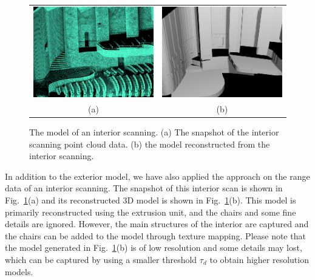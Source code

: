 \documentclass{acmsiggraph}                     %
\newcommand{\Figa}[1]{Fig.~\ref{fig:#1}(a)}
\newcommand{\Figb}[1]{Fig.~\ref{fig:#1}(b)}
\begin{document}
\begin{figure}[htbp]
\begin{center}
\begin{tabular}{cc}
\includegraphics[width=2.5in]{range_crop.png} &
\includegraphics[width=2.5in]{HunterTheatreShaded.jpg} \\
(a) & (b)
\end{tabular}
\end{center}
\caption{The model of an interior scanning. (a) The snapshot of the interior
scanning point cloud data. (b) the model reconstructed from the interior
scanning.}
\label{fig:IN}
\end{figure}

In addition to the exterior model, we have also applied the approach on
the range data of an interior scanning.
The snapshot of this interior scan is shown in \Figa{IN}
and its reconstructed 3D model is shown in \Figb{IN}.
This model is primarily reconstructed using the extrusion unit, and the
chairs and some fine details are ignored. However, the
main structures of the interior are captured and the chairs can be added to
the model through texture mapping.
Please note that the model generated in \Figb{IN} is of low resolution
and some details may lost, which can be captured by using a smaller
threshold $\tau_d$ to obtain higher resolution models.
\end{document}
